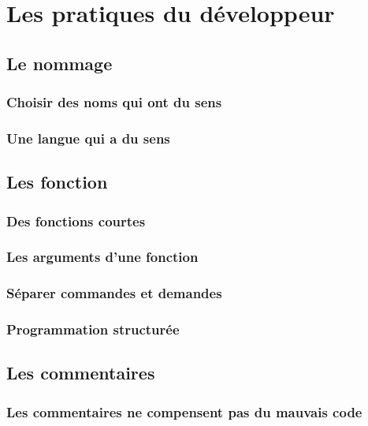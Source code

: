 \section{Les pratiques du développeur}
\label{sec:pratiques}


\lstset{basicstyle=\ttfamily\tiny}

\subsection{Le nommage}
\label{subsec:pratiques-nommage}

\begin{frame}
    \frametitle{Choisir des noms qui ont du sens}
\end{frame}

\begin{frame}
    \frametitle{Une langue qui a du sens}
\end{frame}

\subsection{Les fonction}
\label{subsec:pratiques-fonctions}

\begin{frame}
    \frametitle{Des fonctions courtes}
\end{frame}

\begin{frame}
    \frametitle{Les arguments d'une fonction}
\end{frame}

\begin{frame}
    \frametitle{Séparer commandes et demandes}
\end{frame}

\begin{frame}
    \frametitle{Programmation structurée}
\end{frame}

\subsection{Les commentaires}
\label{subsec:pratiques-commentaires}

\begin{frame}
    \frametitle{Les commentaires ne compensent pas du mauvais code}
\end{frame}

